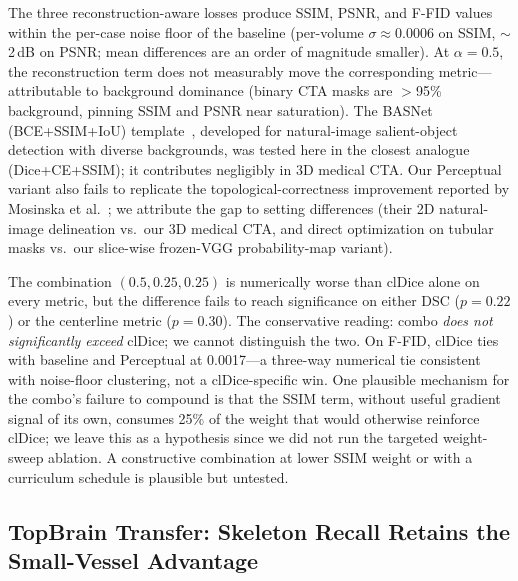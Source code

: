 \documentclass[conference]{IEEEtran}
\begin{document}
The three reconstruction-aware losses produce SSIM, PSNR, and F-FID values within the per-case noise floor of the baseline (per-volume $\sigma{\approx}0.0006$ on SSIM, $\sim$2\,dB on PSNR; mean differences are an order of magnitude smaller). At $\alpha{=}0.5$, the reconstruction term does not measurably move the corresponding metric---attributable to background dominance (binary CTA masks are $>$95\% background, pinning SSIM and PSNR near saturation). The BASNet (BCE+SSIM+IoU) template~\cite{qin2019basnet}, developed for natural-image salient-object detection with diverse backgrounds, was tested here in the closest analogue (Dice+CE+SSIM); it contributes negligibly in 3D medical CTA. Our Perceptual variant also fails to replicate the topological-correctness improvement reported by Mosinska et al.~\cite{mosinska2018}; we attribute the gap to setting differences (their 2D natural-image delineation vs.\ our 3D medical CTA, and direct optimization on tubular masks vs.\ our slice-wise frozen-VGG probability-map variant).

The combination $(0.5, 0.25, 0.25)$ is numerically worse than clDice alone on every metric, but the difference fails to reach significance on either DSC ($p{=}0.22$) or the centerline metric ($p{=}0.30$). The conservative reading: combo \emph{does not significantly exceed} clDice; we cannot distinguish the two. On F-FID, clDice ties with baseline and Perceptual at 0.0017---a three-way numerical tie consistent with noise-floor clustering, not a clDice-specific win. One plausible mechanism for the combo's failure to compound is that the SSIM term, without useful gradient signal of its own, consumes 25\% of the weight that would otherwise reinforce clDice; we leave this as a hypothesis since we did not run the targeted weight-sweep ablation. A constructive combination at lower SSIM weight or with a curriculum schedule is plausible but untested.

\subsection{TopBrain Transfer: Skeleton Recall Retains the Small-Vessel Advantage}
\end{document}

